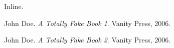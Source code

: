 
\def\mytitle{Inline Citations}


Inline. ~\citep{johndoe.atotallyfakebook1.vanitypress2006.}
~\citep{johndoe.atotallyfakebook2.vanitypress2006.}

\begin{thebibliography}{0}

John Doe. \emph{A Totally Fake Book 1}. Vanity Press, 2006.

John Doe. \emph{A Totally Fake Book 2}. Vanity Press, 2006.
\end{thebibliography}



